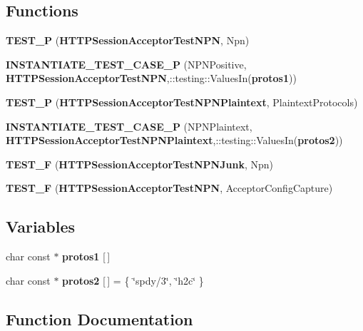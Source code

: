 \subsection*{Functions}
\begin{DoxyCompactItemize}
\item 
{\bf T\+E\+S\+T\+\_\+P} ({\bf H\+T\+T\+P\+Session\+Acceptor\+Test\+N\+PN}, Npn)
\item 
{\bf I\+N\+S\+T\+A\+N\+T\+I\+A\+T\+E\+\_\+\+T\+E\+S\+T\+\_\+\+C\+A\+S\+E\+\_\+P} (N\+P\+N\+Positive, {\bf H\+T\+T\+P\+Session\+Acceptor\+Test\+N\+PN},\+::testing\+::\+Values\+In({\bf protos1}))
\item 
{\bf T\+E\+S\+T\+\_\+P} ({\bf H\+T\+T\+P\+Session\+Acceptor\+Test\+N\+P\+N\+Plaintext}, Plaintext\+Protocols)
\item 
{\bf I\+N\+S\+T\+A\+N\+T\+I\+A\+T\+E\+\_\+\+T\+E\+S\+T\+\_\+\+C\+A\+S\+E\+\_\+P} (N\+P\+N\+Plaintext, {\bf H\+T\+T\+P\+Session\+Acceptor\+Test\+N\+P\+N\+Plaintext},\+::testing\+::\+Values\+In({\bf protos2}))
\item 
{\bf T\+E\+S\+T\+\_\+F} ({\bf H\+T\+T\+P\+Session\+Acceptor\+Test\+N\+P\+N\+Junk}, Npn)
\item 
{\bf T\+E\+S\+T\+\_\+F} ({\bf H\+T\+T\+P\+Session\+Acceptor\+Test\+N\+PN}, Acceptor\+Config\+Capture)
\end{DoxyCompactItemize}
\subsection*{Variables}
\begin{DoxyCompactItemize}
\item 
char const $\ast$ {\bf protos1} [$\,$]
\item 
char const $\ast$ {\bf protos2} [$\,$] = \{ \char`\"{}spdy/3\char`\"{}, \char`\"{}h2c\char`\"{} \}
\end{DoxyCompactItemize}


\subsection{Function Documentation}
